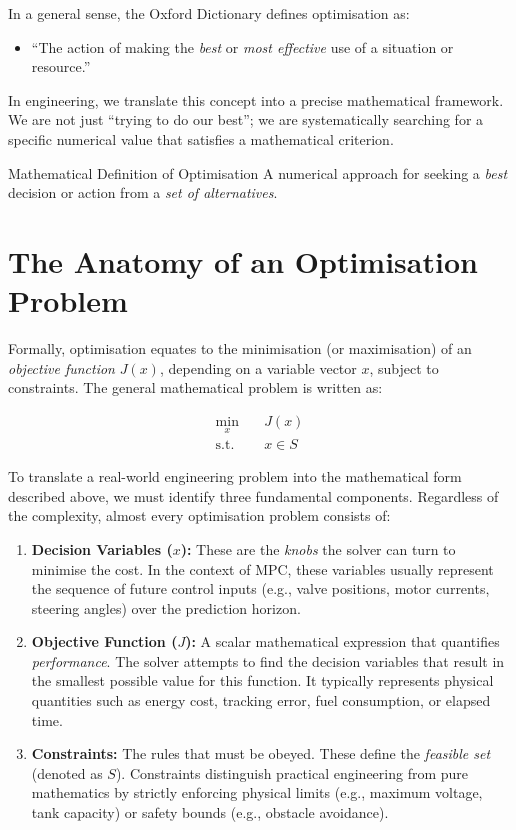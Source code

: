 In a general sense, the Oxford Dictionary defines optimisation as:
\begin{itemize}
	\item ``The action of making the \emph{best} or \emph{most effective} use of a situation or resource.''
\end{itemize}

In engineering, we translate this concept into a precise mathematical framework. We are not just ``trying to do our best''; we are systematically searching for a specific numerical value that satisfies a mathematical criterion.

\begin{defnbox}{Mathematical Definition of Optimisation}
	A numerical approach for seeking a \emph{best} decision or action from a \emph{set of alternatives}.
\end{defnbox}

\section{The Anatomy of an Optimisation Problem}

Formally, optimisation equates to the minimisation (or maximisation) of an \textit{objective function} $J(x)$, depending on a variable vector $x$, subject to constraints. The general mathematical problem is written as:

\begin{equation}
	\begin{aligned}
		\min_{x} \quad & J(x) \\
		\text{s.t.} \quad & x \in S
	\end{aligned}
\end{equation}

To translate a real-world engineering problem into the mathematical form described above, we must identify three fundamental components. Regardless of the complexity, almost every optimisation problem consists of:

\begin{enumerate}
	\item \textbf{Decision Variables ($x$):} These are the \emph{knobs} the solver can turn to minimise the cost. In the context of MPC, these variables usually represent the sequence of future control inputs (e.g., valve positions, motor currents, steering angles) over the prediction horizon.
	
	\item \textbf{Objective Function ($J$):} A scalar mathematical expression that quantifies \emph{performance}. The solver attempts to find the decision variables that result in the smallest possible value for this function. It typically represents physical quantities such as energy cost, tracking error, fuel consumption, or elapsed time.
	
	\item \textbf{Constraints:} The rules that must be obeyed. These define the \textit{feasible set} (denoted as $S$). Constraints distinguish practical engineering from pure mathematics by strictly enforcing physical limits (e.g., maximum voltage, tank capacity) or safety bounds (e.g., obstacle avoidance).
\end{enumerate}

